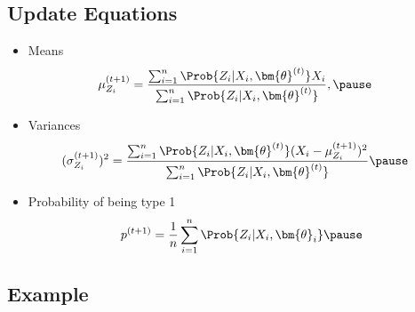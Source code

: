 \begin{slide}
\section[-2]{Update Equations}

\begin{PauseHighLight}
  \begin{itemize}
  \item Means
    \begin{align*}
      \mu_{Z_i}^{(t+1)}
      &= \frac{ \sum_{i=1}^n \Prob{Z_i|X_i,\bm{\theta}^{(t)}} X_i}
        {\sum_{i=1}^n \Prob{Z_i|X_i,\bm{\theta}^{(t)}}},\pause
    \end{align*}
\item Variances
  \begin{align*}
    (\sigma_{Z_i}^{(t+1)})^2
      &= \frac{ \sum_{i=1}^n \Prob{Z_i|X_i,\bm{\theta}^{(t)}}
        (X_i-\mu^{(t+1)}_{Z_i})^2}
        {\sum_{i=1}^n \Prob{Z_i|X_i,\bm{\theta}^{(t)}}}\pause
  \end{align*}
  \item Probability of being type 1
    \begin{align*}
      p^{(t+1)} = \frac{1}{n} \sum_{i=1}^n \Prob{Z_i|X_i, \bm{\theta}_i}\pause
    \end{align*}
  \end{itemize}
\end{PauseHighLight}
  
\end{slide}



\begin{slide}
\section{Example}
\pause
\pb
\begin{center}
  \pause
\end{center}
\end{slide}

\Outline %

